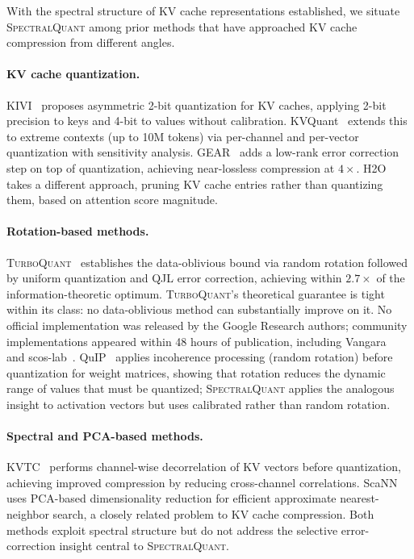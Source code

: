 \documentclass[11pt]{article}
\newcommand{\TQ}{\textsc{TurboQuant}}
\newcommand{\SQ}{\textsc{SpectralQuant}}
\begin{document}
With the spectral structure of KV cache representations established, we situate
\SQ{} among prior methods that have approached KV cache compression from different angles.

\paragraph{KV cache quantization.}
KIVI~\citep{liu2024kivi} proposes asymmetric 2-bit quantization for KV caches,
applying 2-bit precision to keys and 4-bit to values without calibration.
KVQuant~\citep{hooper2024kvquant} extends this to extreme contexts (up to
10M tokens) via per-channel and per-vector quantization with sensitivity
analysis.  GEAR~\citep{feng2024gear} adds a low-rank error correction step on
top of quantization, achieving near-lossless compression at $4\times$.
H2O~\citep{ge2024model} takes a different approach, pruning KV cache entries
rather than quantizing them, based on attention score magnitude.

\paragraph{Rotation-based methods.}
\TQ{}~\citep{zandieh2025turboquant} establishes the data-oblivious bound via
random rotation followed by uniform quantization and QJL error correction,
achieving within $2.7\times$ of the information-theoretic optimum.  \TQ{}'s
theoretical guarantee is tight within its class: no data-oblivious method can
substantially improve on it.  No official implementation was released by the
Google Research authors; community implementations appeared within 48 hours of
publication, including Vangara~\citep{vangara2026turboquant_cutile} and
scos-lab~\citep{scos_lab_turboquant}.  QuIP~\citep{chee2024quip} applies
incoherence processing (random rotation) before quantization for weight
matrices, showing that rotation reduces the dynamic range of values that must
be quantized; \SQ{} applies the analogous insight to activation vectors but
uses calibrated rather than random rotation.

\paragraph{Spectral and PCA-based methods.}
KVTC~\citep{kvtc2025} performs channel-wise decorrelation of KV vectors before
quantization, achieving improved compression by reducing cross-channel
correlations.  ScaNN~\citep{gerganov2024scann} uses PCA-based dimensionality
reduction for efficient approximate nearest-neighbor search, a closely related
problem to KV cache compression.  Both methods exploit spectral structure but
do not address the selective error-correction insight central to \SQ{}.
\end{document}
